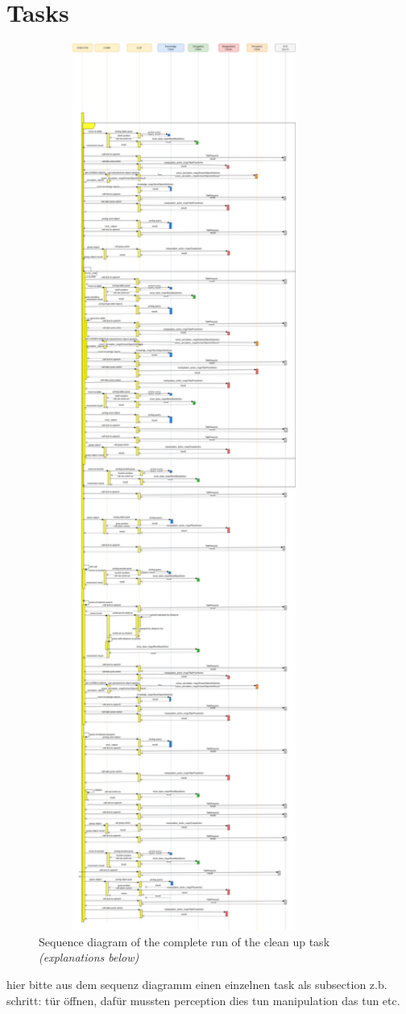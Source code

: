 \documentclass[main.tex]{subfiles}
\begin{document}
	  	\section{Tasks}
	  	\begin{figure}	
	  		\centering
	  		\includegraphics[width=0.85\textwidth]{pictures/diagramms/cleanup-sequence.png}
	  		\caption{Sequence diagram of the complete run of the clean up task \textit{(explanations below)}}
	  		\label{cleanup-sequence}
	  	\end{figure}
		hier bitte aus dem sequenz diagramm einen einzelnen task als subsection z.b. schritt: tür öffnen, dafür mussten perception dies tun manipulation das tun etc.
		
\end{document}
